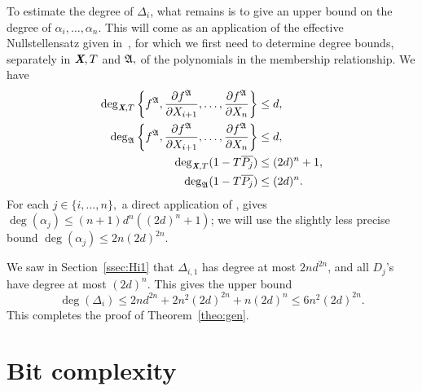 \documentclass[sigconf]{acmart}
\def\Xb{\textit{\textbf{X}}}
\def\pjb{\overline{P_{j}}}
\def\D{\Delta}
\def\A{\frak{A}}
\begin{document}
To estimate the degree of $\D_{i}$, what remains is to give an upper
bound on the degree of $\alpha_i,\dots,\alpha_n$. This will come as an
application of the effective Nullstellensatz given in~\cite{EN}, for
which we first need to determine degree bounds, separately in $\Xb,T$
and $\A,$ of the polynomials in the membership relationship. We have
\begin{align*}
\deg_{\Xb,T}\left\{ 
f^\A,\frac{\partial f^\A}{\partial X_{i+1}},\hdots,\frac{\partial f^\A}{\partial X_n}
\right\}&\leq d,\\
\deg_{\A}  
\left\{ 
f^\A,\frac{\partial f^\A}{\partial X_{i+1}},\hdots,\frac{\partial f^\A}{\partial X_n}
\right\}& \leq d,\\
\deg_{\Xb,T}(1-T\pjb) &\leq (2d)^n +1,\\
\deg_{\A}(1-T\pjb)& \leq (2d)^n.
\end{align*}
For each $j \in \{i,\hdots,n\},$ a direct application of \cite[Theorem
0.5]{EN}, gives $\deg(\alpha_j) \le (n+1)d^n((2d)^n+1)$; we will use
the slightly less precise bound $\deg(\alpha_j) \le 2n(2d)^{2n}$.


We saw in Section~\ref{ssec:Hi1} that $\D_{i,1}$ has degree at most
$2nd^{2n}$, and all $D_j$'s have degree at most $(2d)^n$. This gives
the upper bound
$$\deg(\D_i) \le 2nd^{2n} + 2n^2(2d)^{2n} + n(2d)^n \le 6n^2 (2d)^{2n}.$$
This completes the proof of Theorem~\ref{theo:gen}.



\section{Bit complexity}%
\end{document}
